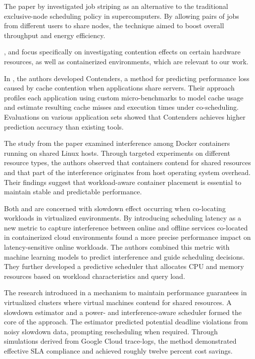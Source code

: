 The paper by \cite{10.1002/cpe.3187} investigated job striping as an alternative to the traditional exclusive-node scheduling policy in supercomputers. By allowing pairs of jobs from different users to share nodes, the technique aimed to boost overall throughput and energy efficiency.

\cite{11044815}, \cite{8397647} and \cite{10501918} focus specifically on investigating contention effects on certain hardware resources, as well as containerized environments, which are relevant to our work.

In \cite{11044815}, the authors developed Contenders, a method for predicting performance loss caused by cache contention when applications share servers. Their approach profiles each application using custom micro-benchmarks to model cache usage and estimate resulting cache misses and execution times under co-scheduling. Evaluations on various application sets showed that Contenders achieves higher prediction accuracy than existing tools.

The study from the paper \cite{8397647} examined interference among Docker containers running on shared Linux hosts. Through targeted experiments on different resource types, the authors observed that containers contend for shared resources and that part of the interference originates from host operating system overhead. Their findings suggest that workload-aware container placement is essential to maintain stable and predictable performance.

Both \cite{10501918} and \cite{6924435} are concerned with slowdown effect occurring when co-locating workloads in virtualized environments.
By introducing scheduling latency as a new metric to capture interference between online and offline services co-located in containerized cloud environments \cite{10501918} found a more precise performance impact on latency-sensitive online workloads. The authors combined this metric with machine learning models to predict interference and guide scheduling decisions. They further developed a predictive scheduler that allocates CPU and memory resources based on workload characteristics and query load.

The research introduced in \cite{6924435} a mechanism to maintain performance guarantees in virtualized clusters where virtual machines contend for shared resources. A slowdown estimator and a power- and interference-aware scheduler formed the core of the approach. The estimator predicted potential deadline violations from noisy slowdown data, prompting rescheduling when required. Through simulations derived from Google Cloud trace-logs, the method demonstrated effective SLA compliance and achieved roughly twelve percent cost savings.

